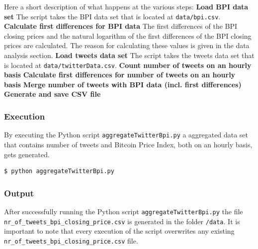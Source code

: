 \documentclass[a4paper,12pt]{article}
\begin{document}
\begin{spacing}{1.2}
Here a short description of what happens at the various steps: 
\linebreak\linebreak
\textbf{Load BPI data set} The script takes the BPI data set that is located at \verb|data/bpi.csv|.
\linebreak\linebreak
\textbf{Calculate first differences for BPI data} The first differences of the BPI closing prices and the natural logarithm of the first differences of the BPI closing prices are calculated. The reason for calculating these values is given in the data analysis section.
\linebreak\linebreak
\textbf{Load tweets data set} The script takes the tweets data set that is located at \verb|data/twitterData.csv|.
\linebreak\linebreak
\textbf{Count number of tweets on an hourly basis} 
\linebreak\linebreak
\textbf{Calculate first differences for number of tweets on an hourly basis} 
\linebreak\linebreak
\textbf{Merge number of tweets with BPI data (incl. first differences)} 
\linebreak\linebreak
\textbf{Generate and save CSV file}

\subsubsection{Execution}
By executing the Python script \verb|aggregateTwitterBpi.py| a aggregated data set that contains number of tweets and Bitcoin Price Index, both on an hourly basis, gets generated. 
\begin{lstlisting}[language=bash]
    $ python aggregateTwitterBpi.py
\end{lstlisting}

\subsubsection{Output}
After successfully running the Python script \verb|aggregateTwitterBpi.py| the file \verb|nr_of_tweets_bpi_closing_price.csv| is generated in the folder \verb|/data|. It is important to note that every execution of the script overwrites any existing \verb|nr_of_tweets_bpi_closing_price.csv| file.


\end{spacing}
\end{document}
